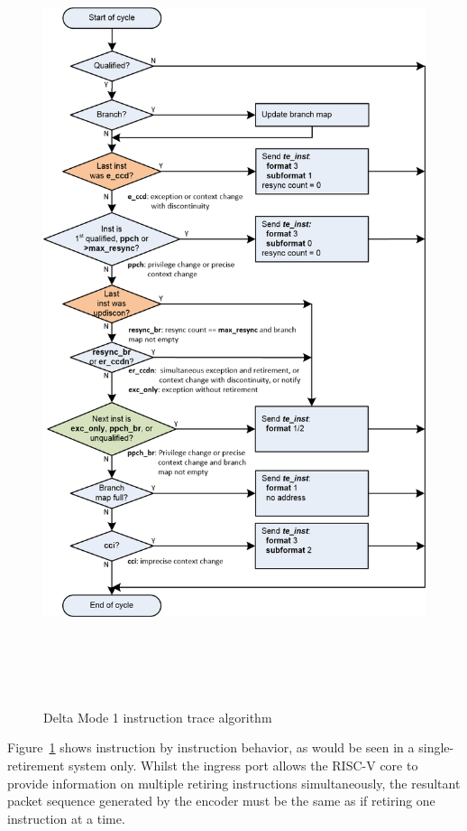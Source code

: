 \begin{figure}[l]
\begin{center}
  \includegraphics[height=23cm, width=15cm]{algo.png}
  \caption{Delta Mode 1 instruction trace algorithm}
  \label{fig:algo}
\end{center}
\end{figure}

Figure~\ref{fig:algo} shows instruction by instruction behavior, as would be
seen in a single-retirement system only.  Whilst the ingress port allows the RISC-V core to
provide information on multiple retiring instructions simultaneously, the resultant packet
sequence generated by the encoder must be the same as if retiring one instruction at a time.

